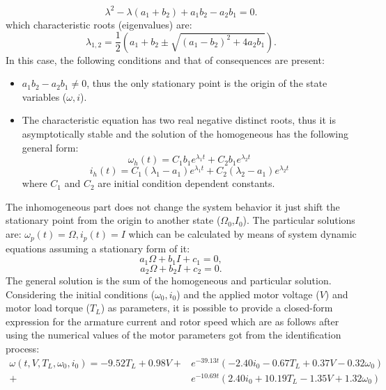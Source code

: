 \documentclass[12pt,english,twoside]{article}
\begin{document}
\begin{equation}
\lambda^2-\lambda (a_1+b_2)+a_1 b_2 - a_2 b_1=0.
\end{equation}
which characteristic roots (eigenvalues) are:
\begin{equation}
\lambda_{1,2}=\frac{1}{2} \left({a_1}+{b_2} \pm \sqrt{({a_1}-{b_2})^2+4 {a_2} {b_1}}\right).
\end{equation}
In this case, the following conditions and that of consequences are present:
\begin{itemize}
	\item $a_1 b_2 - a_2 b_1 \neq 0$, thus the only stationary point is the origin of the state variables ($\omega,i$).
	\item The characteristic equation has two real negative distinct roots, thus it is asymptotically stable and the solution of the homogeneous has the following general form: \cite{eqworld}
	\begin{equation}
		\omega_h(t) = C_1 b_1 e^{\lambda_1 t} + C_2 b_1 e^{\lambda_2 t}
	\end{equation}
	\begin{equation}
		i_h(t) = C_1 (\lambda_1-a_1) e^{\lambda_1 t} + C_2 (\lambda_2-a_1) e^{\lambda_2 t}
	\end{equation}
	where $C_1$ and $C_2$ are initial condition dependent constants.
\end{itemize}
The inhomogeneous part does not change the system behavior it just shift the stationary point from the origin to another state ($\Omega_0$,$I_0$). The particular solutions are:
	$\omega_p(t) = \Omega,
	i_p(t) = I$
which can be calculated by means of system dynamic equations assuming a stationary form of it:
\begin{equation}
	a_1 \Omega + b_1 I + c_1 =0,
\end{equation}
\begin{equation}
	a_2 \Omega + b_2 I + c_2 =0.
\end{equation}
The general solution is the sum of the homogeneous and particular solution. Considering the initial conditions ($\omega_0,i_0$) and the applied motor voltage ($V$) and motor load torque ($T_L$) as parameters, it is possible to provide a closed-form expression for the armature current and rotor speed which are as follows after using the numerical values of the motor parameters got from the identification process:
\begin{equation}
\begin{split}
	\omega(t,V,T_L,\omega_0,i_0) = -9.52 T_L + 0.98 V + 
	&e^{-39.13 t} (-2.40 i_0 - 0.67 T_L + 0.37 V - 0.32 \omega_0) \\
	+&e^{-10.69 t} (2.40 i_0 + 10.19 T_L - 1.35 V + 
	1.32 \omega_0)
\end{split}
\end{equation}
\end{document}
